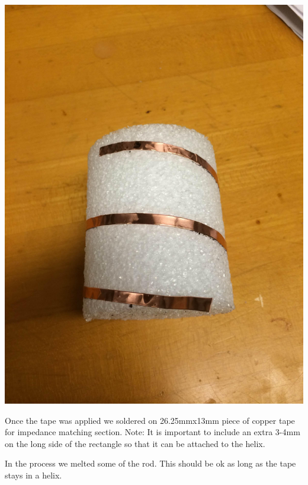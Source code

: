 \documentclass[11pt]{article} %
\begin{document}
\begin{center}
\includegraphics[scale=0.08]{feed/11.jpeg}
\end{center}


Once the tape was applied we soldered on 26.25mmx13mm piece of copper tape for impedance matching section. Note: It is important to include an extra 3-4mm on the long side of the rectangle so that it can be attached to the helix. 


In the process we melted some of the rod. This should be ok as long as the tape stays in a helix. 
\end{document}
